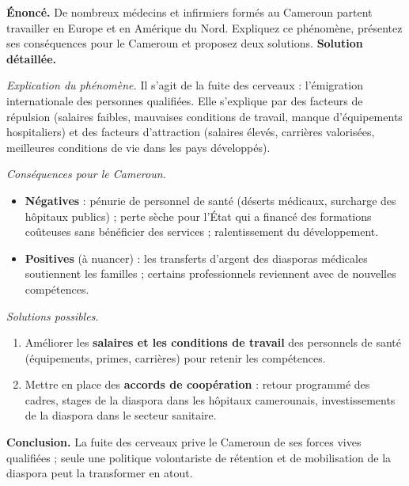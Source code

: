 \documentclass[11pt]{article}
\newcommand{\cle}[1]{{\popxbold\color{popdark}#1}}
\begin{document}
\begin{exoresolu}
\textbf{Énoncé.} De nombreux médecins et infirmiers formés au Cameroun partent travailler en Europe et en Amérique du Nord. Expliquez ce phénomène, présentez ses conséquences pour le Cameroun et proposez deux solutions.
\tcblower
\textbf{Solution détaillée.}

\emph{Explication du phénomène.} Il s'agit de la \cle{fuite des cerveaux} : l'émigration internationale des personnes qualifiées. Elle s'explique par des facteurs de répulsion (salaires faibles, mauvaises conditions de travail, manque d'équipements hospitaliers) et des facteurs d'attraction (salaires élevés, carrières valorisées, meilleures conditions de vie dans les pays développés).

\emph{Conséquences pour le Cameroun.}
\begin{itemize}
\item \textbf{Négatives} : pénurie de personnel de santé (déserts médicaux, surcharge des hôpitaux publics) ; perte sèche pour l'État qui a financé des formations coûteuses sans bénéficier des services ; ralentissement du développement.
\item \textbf{Positives} (à nuancer) : les transferts d'argent des diasporas médicales soutiennent les familles ; certains professionnels reviennent avec de nouvelles compétences.
\end{itemize}

\emph{Solutions possibles.}
\begin{enumerate}
\item Améliorer les \textbf{salaires et les conditions de travail} des personnels de santé (équipements, primes, carrières) pour retenir les compétences.
\item Mettre en place des \textbf{accords de coopération} : retour programmé des cadres, stages de la diaspora dans les hôpitaux camerounais, investissements de la diaspora dans le secteur sanitaire.
\end{enumerate}
\textbf{Conclusion.} La fuite des cerveaux prive le Cameroun de ses forces vives qualifiées ; seule une politique volontariste de rétention et de mobilisation de la diaspora peut la transformer en atout.
\end{exoresolu}
\end{document}

